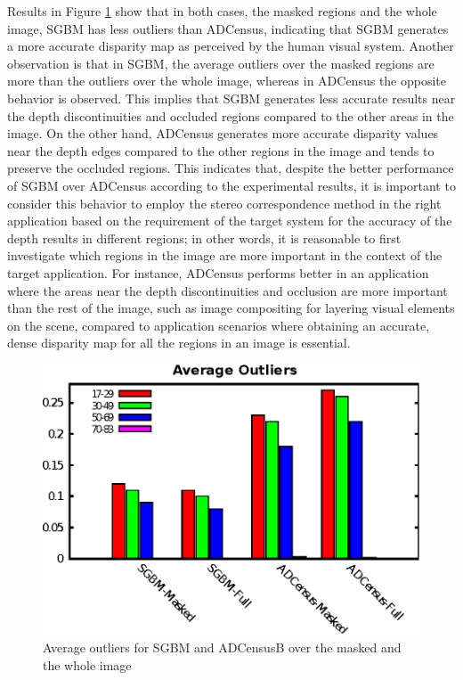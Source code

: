 Results in Figure \ref{fig:outlbar} show that in both cases, the masked regions and the whole image, SGBM has less outliers than ADCensus, indicating that
SGBM generates a more accurate disparity map as perceived by the human visual system.
Another observation is that in SGBM, the average outliers over the masked regions are more than the outliers over the whole image, whereas in ADCensus the
opposite behavior is observed. This implies that SGBM generates less accurate results
near the depth discontinuities and occluded regions compared to the other areas in the image.
On the other hand, ADCensus generates more accurate disparity values near the depth edges compared to the other regions in the image and 
tends to preserve the occluded regions. This indicates that, despite the better performance of SGBM over ADCensus according to the
experimental results, it is important to consider this behavior to employ the stereo correspondence method
in the right application based on the requirement of the target system for the accuracy of the depth results in different regions; in other
words, it is reasonable to first investigate which regions in the image are more important in the context of the target application.
For instance, ADCensus performs better in an application where the areas
near the depth discontinuities and occlusion are more important than the rest of the image, such as image compositing for layering visual elements
on the scene, compared to application scenarios where obtaining an accurate, dense disparity map for all the regions in an image is essential.

\begin{figure}[H]
\centering
\includegraphics[scale=0.95]{outlchart}
\caption{Average outliers for SGBM and ADCensusB over the masked and the whole image}
\label{fig:outlbar}
\end{figure} 

